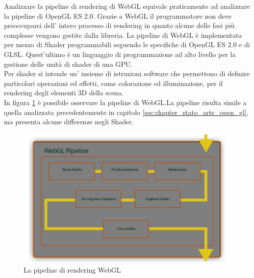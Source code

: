 Analizzare la pipeline di rendering di WebGL equivale praticamente ad analizzare la pipeline di OpenGL ES 2.0. Grazie a WebGL il programmatore non deve preoccuparsi dell’ intero processo di rendering in quanto alcune delle fasi più complesse vengono gestite dalla libreria.
La pipeline di WebGL è implementata per mezzo di Shader programmabili seguendo le specifiche di OpenGL ES 2.0 e di GLSL. Quest’ultimo è un linguaggio di programmazione ad alto livello per la gestione delle unità di shader di una GPU.
\\
Per shader si intende un’ insieme di istruzioni software che permettono di definire particolari operazioni ed effetti, come colorazione ed illuminazione, per il rendering degli elementi 3D della scena.
\\
In figura \ref{fig:tecnologie_abilitanti_webglrender}  è possibile osservare la pipeline di WebGL.La pipeline risulta simile a quella analizzata precedentemente in capitolo \ref{sec:chapter_stato_arte_open_gl}, ma presenta alcune differenze negli Shader.
\\
\begin{figure}[htb]
 \centering
 \includegraphics[width=1\linewidth]{images/chapter_tecnologie_abilitanti/tecnologie_abilitanti_webglrender.png}\hfill
 \caption[La pipeline di WebGL]{La pipeline di rendering WebGL}
 \label{fig:tecnologie_abilitanti_webglrender}
\end{figure}

